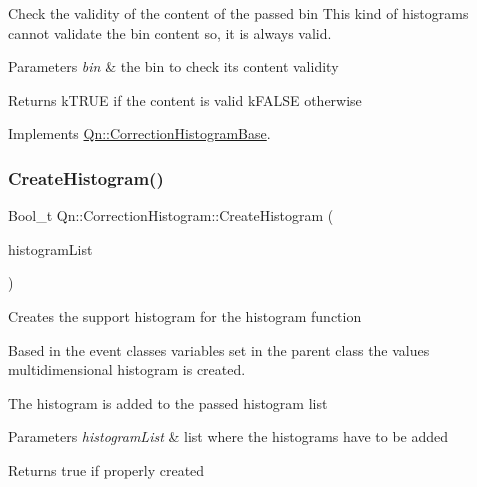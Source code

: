 Check the validity of the content of the passed bin This kind of histograms cannot validate the bin content so, it is always valid. 
\begin{DoxyParams}{Parameters}
{\em bin} & the bin to check its content validity \\
\hline
\end{DoxyParams}
\begin{DoxyReturn}{Returns}
k\+T\+R\+UE if the content is valid k\+F\+A\+L\+SE otherwise 
\end{DoxyReturn}


Implements \mbox{\hyperlink{classQn_1_1CorrectionHistogramBase_a4db2c92ceaffefaa91475a721612d80d}{Qn\+::\+Correction\+Histogram\+Base}}.

\mbox{\label{classQn_1_1CorrectionHistogram_a5d7baa24476a584ad144923ec2bec7a5}} 
\subsubsection{\texorpdfstring{Create\+Histogram()}{CreateHistogram()}}
{\footnotesize\ttfamily Bool\+\_\+t Qn\+::\+Correction\+Histogram\+::\+Create\+Histogram (\begin{DoxyParamCaption}\item[{T\+List $\ast$}]{histogram\+List }\end{DoxyParamCaption})}

Creates the support histogram for the histogram function

Based in the event classes variables set in the parent class the values multidimensional histogram is created.

The histogram is added to the passed histogram list


\begin{DoxyParams}{Parameters}
{\em histogram\+List} & list where the histograms have to be added \\
\hline
\end{DoxyParams}
\begin{DoxyReturn}{Returns}
true if properly created 
\end{DoxyReturn}
\mbox{\label{classQn_1_1CorrectionHistogram_a3704882797e987dc62c31d953f49ec7e}} 
